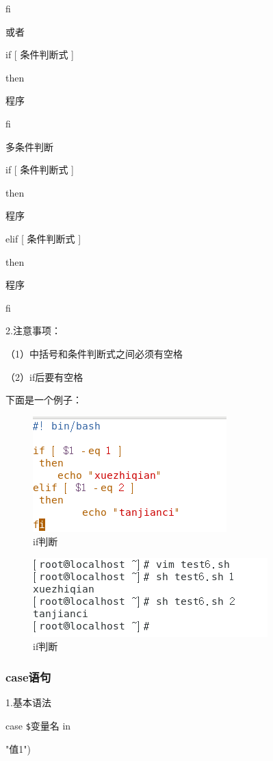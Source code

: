 \documentclass{ctexart}
\begin{document}
	fi
	
	或者
	
	if [ 条件判断式 ]
	
	then
	
	\quad \quad 程序
	
	fi
	
	多条件判断
	
	if [ 条件判断式 ]
	
	then
	
	\quad \quad 程序
	
	elif [ 条件判断式 ]  
	
	then 
	
	\quad \quad 程序
	
	fi
	
	2.注意事项：
	
	（1）中括号和条件判断式之间必须有空格
	
	（2）if后要有空格
	
	下面是一个例子：
	
	\begin{figure}[H]
		\centering
		\includegraphics{2.19}
		\caption{if判断}
	\end{figure}
	
	\begin{figure}[H]
		\centering
		\includegraphics{2.20}
		\caption{if判断}
	\end{figure}
	
	\subsubsection{case语句}
	
	1.基本语法
	
	case \verb|$|变量名 in
	
	"值1")
	
\end{document}
